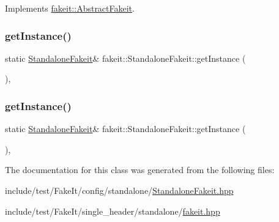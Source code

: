 Implements \mbox{\hyperlink{classfakeit_1_1AbstractFakeit_a9476180a503524d49d1978fbbc125b01}{fakeit\+::\+Abstract\+Fakeit}}.

\mbox{\label{classfakeit_1_1StandaloneFakeit_a241a8b4b522c7cfcfd74bcf282406c8e}} 
\subsubsection{\texorpdfstring{getInstance()}{getInstance()}\hspace{0.1cm}{\footnotesize\ttfamily [1/2]}}
{\footnotesize\ttfamily static \mbox{\hyperlink{classfakeit_1_1StandaloneFakeit}{Standalone\+Fakeit}}\& fakeit\+::\+Standalone\+Fakeit\+::get\+Instance (\begin{DoxyParamCaption}{ }\end{DoxyParamCaption})\hspace{0.3cm}{\ttfamily [inline]}, {\ttfamily [static]}}

\mbox{\label{classfakeit_1_1StandaloneFakeit_a241a8b4b522c7cfcfd74bcf282406c8e}} 
\subsubsection{\texorpdfstring{getInstance()}{getInstance()}\hspace{0.1cm}{\footnotesize\ttfamily [2/2]}}
{\footnotesize\ttfamily static \mbox{\hyperlink{classfakeit_1_1StandaloneFakeit}{Standalone\+Fakeit}}\& fakeit\+::\+Standalone\+Fakeit\+::get\+Instance (\begin{DoxyParamCaption}{ }\end{DoxyParamCaption})\hspace{0.3cm}{\ttfamily [inline]}, {\ttfamily [static]}}



The documentation for this class was generated from the following files\+:\begin{DoxyCompactItemize}
\item 
include/test/\+Fake\+It/config/standalone/\mbox{\hyperlink{StandaloneFakeit_8hpp}{Standalone\+Fakeit.\+hpp}}\item 
include/test/\+Fake\+It/single\+\_\+header/standalone/\mbox{\hyperlink{single__header_2standalone_2fakeit_8hpp}{fakeit.\+hpp}}\end{DoxyCompactItemize}
